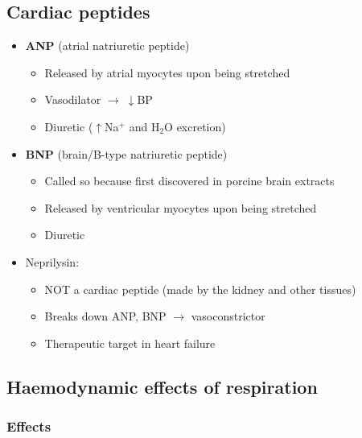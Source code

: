 \documentclass[
  12pt,
]{memoir}
\providecommand{\tightlist}{%
  \setlength{\itemsep}{0pt}\setlength{\parskip}{0pt}}
\begin{document}
\hypertarget{cardiac-peptides}{%
\subsection{Cardiac peptides}\label{cardiac-peptides}}

\begin{itemize}
\tightlist
\item
  \textbf{ANP} (atrial natriuretic peptide)

  \begin{itemize}
  \tightlist
  \item
    Released by atrial myocytes upon being stretched
  \item
    Vasodilator \(\rightarrow\;\downarrow\)BP
  \item
    Diuretic (\(\uparrow\)Na\(^+\) and H\(_2\)O excretion)
  \end{itemize}
\item
  \textbf{BNP} (brain/B-type natriuretic peptide)

  \begin{itemize}
  \tightlist
  \item
    Called so because first discovered in porcine brain extracts
  \item
    Released by ventricular myocytes upon being stretched
  \item
    Diuretic
  \end{itemize}
\item
  Neprilysin:

  \begin{itemize}
  \tightlist
  \item
    NOT a cardiac peptide (made by the kidney and other tissues)
  \item
    Breaks down ANP, BNP \(\rightarrow\) vasoconstrictor
  \item
    Therapeutic target in heart failure
  \end{itemize}
\end{itemize}

\hypertarget{haemodynamic-effects-of-respiration}{%
\subsection{Haemodynamic effects of
respiration}\label{haemodynamic-effects-of-respiration}}

\hypertarget{effects}{%
\subsubsection{Effects}\label{effects}}
\end{document}
